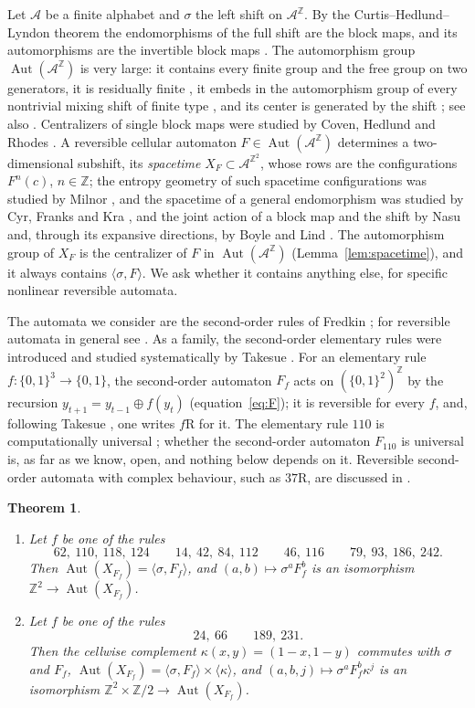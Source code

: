 \documentclass[11pt]{amsart}
\newtheorem{theorem}{Theorem}[section]
\theoremstyle{definition}
\theoremstyle{remark}
\theoremstyle{plain}
\newcommand{\Z}{\mathbb{Z}}
\newcommand{\A}{\mathcal{A}}
\newcommand{\Aut}{\operatorname{Aut}}
\newcommand{\sh}{\sigma}
\begin{document}
Let $\A$ be a finite alphabet and $\sh$ the left shift on $\A^{\Z}$. By the Curtis--Hedlund--Lyndon theorem \cite{Hedlund1969} the endomorphisms of the full shift are the block maps, and its automorphisms are the invertible block maps \cite{LindMarcus,CSC}. The automorphism group $\Aut(\A^{\Z})$ is very large: it contains every finite group and the free group on two generators, it is residually finite \cite{BLR1988}, it embeds in the automorphism group of every nontrivial mixing shift of finite type \cite[Theorem~3.2]{KR1990}, and its center is generated by the shift \cite{Ryan1972}; see also \cite{CFKP,FST}. Centralizers of single block maps were studied by Coven, Hedlund and Rhodes \cite{CHR1979}. A reversible cellular automaton $F\in\Aut(\A^{\Z})$ determines a two-dimensional subshift, its \emph{spacetime} $X_F\subset\A^{\Z^2}$, whose rows are the configurations $F^n(c)$, $n\in\Z$; the entropy geometry of such spacetime configurations was studied by Milnor \cite{Milnor1988}, and the spacetime of a general endomorphism was studied by Cyr, Franks and Kra \cite{CFK2019}, and the joint action of a block map and the shift by Nasu \cite{Nasu} and, through its expansive directions, by Boyle and Lind \cite{BoyleLind}. The automorphism group of $X_F$ is the centralizer of $F$ in $\Aut(\A^{\Z})$ (Lemma~\ref{lem:spacetime}), and it always contains $\langle\sh,F\rangle$. We ask whether it contains anything else, for specific nonlinear reversible automata.

The automata we consider are the second-order rules of Fredkin \cite{Margolus1984,TM1990,Wolfram2002}; for reversible automata in general see \cite{Toffoli1977,Kari,Morita}. As a family, the second-order elementary rules were introduced and studied systematically by Takesue \cite{Takesue1987,Takesue1989}. For an elementary rule $f\colon\{0,1\}^3\to\{0,1\}$, the second-order automaton $F_f$ acts on $(\{0,1\}^2)^{\Z}$ by the recursion $y_{t+1}=y_{t-1}\oplus f(y_t)$ (equation~\eqref{eq:F}); it is reversible for every $f$, and, following Takesue \cite{Takesue1987}, one writes $f$R for it. The elementary rule $110$ is computationally universal \cite{Cook2004}; whether the second-order automaton $F_{110}$ is universal is, as far as we know, open, and nothing below depends on it. Reversible second-order automata with complex behaviour, such as $37$R, are discussed in \cite[pp.~437--457]{Wolfram2002}.

\begin{theorem}\label{thm:main}
\begin{enumerate}
\item[(a)] Let $f$ be one of the rules
\[
62,\ 110,\ 118,\ 124\qquad 14,\ 42,\ 84,\ 112\qquad 46,\ 116\qquad 79,\ 93,\ 186,\ 242.
\]
Then $\Aut(X_{F_f})=\langle\sh,F_f\rangle$, and $(a,b)\mapsto\sh^aF_f^b$ is an isomorphism $\Z^2\to\Aut(X_{F_f})$.
\item[(b)] Let $f$ be one of the rules
\[
24,\ 66\qquad 189,\ 231.
\]
Then the cellwise complement $\kappa(x,y)=(1-x,1-y)$ commutes with $\sh$ and $F_f$, $\Aut(X_{F_f})=\langle\sh,F_f\rangle\times\langle\kappa\rangle$, and $(a,b,j)\mapsto\sh^aF_f^b\kappa^j$ is an isomorphism $\Z^2\times\Z/2\to\Aut(X_{F_f})$.
\end{enumerate}
\end{theorem}
\end{document}
